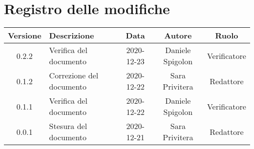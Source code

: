 \section*{Registro delle modifiche}

\begin{center}
	\begin{longtable}{|c|p{5cm}|c|c|c|}
	\hline
	\rowcolor{lighter-grayer}
	\textbf{Versione} & \textbf{Descrizione} & \textbf{Data} & \textbf{Autore} & \textbf{Ruolo} \\
	\hline
	\endfirsthead


	\hline
	0.2.2 & Verifica del documento & 2020-12-23 & Daniele Spigolon & Verificatore \\
	\hline
	0.1.2 & Correzione del documento & 2020-12-22 & Sara Privitera & Redattore \\
	\hline
	0.1.1 & Verifica del documento & 2020-12-22 & Daniele Spigolon & Verificatore \\
	\hline
	0.0.1 & Stesura del documento & 2020-12-21 & Sara Privitera & Redattore \\
	\hline
	
    
	\end{longtable}
\end{center}
